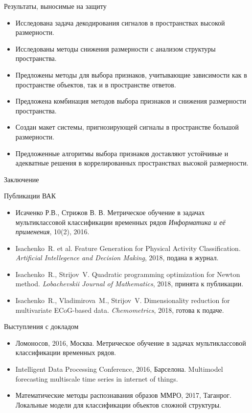 \documentclass[9pt]{beamer}
\begin{document}
\begin{frame}{Результаты, выносимые на защиту}
\begin{itemize}
	\item Исследована задача декодирования сигналов в пространствах высокой размерности.
	\vfill
	\item Исследованы методы снижения размерности с анализом структуры пространства.
	\vfill
	\item Предложены методы для выбора признаков, учитывающие зависимости как в пространстве объектов, так и в пространстве ответов.
	\vfill
	\item Предложена комбинация методов выбора признаков и снижения размерности пространства.
	\vfill
	\item Создан макет системы, пригнозирующей сигналы в пространстве большой размерности.
	\vfill
	\item Предложенные алгоритмы выбора признаков доставляют устойчивые и адекватные решения в коррелированных пространствах высокой размерности.
\end{itemize}
\end{frame}
\begin{frame}{Заключение}
	\begin{block}{Публикации ВАК}
		\vspace{-0.2cm}
		\begin{itemize}
			\item Исаченко Р.В., Стрижов В. В. Метрическое обучение в задачах мультиклассовой классификации временных рядов \emph{Информатика и её применения}, 10(2), 2016.
			\item Isachenko~R. et al. Feature Generation for Physical Activity Classification. \emph{Artificial Intellegence and Decision Making}, 2018, подана в журнал.
			\item Isachenko~R., Strijov~V. Quadratic programming optimization for Newton method. \emph{Lobachevskii Journal of Mathematics}, 2018, принята к публикации.
			\item Isachenko~R., Vladimirova~M., Strijov~V. Dimensionality reduction for multivariate ECoG-based data. \emph{Chemometrics}, 2018, готова к подаче.
		\end{itemize}
	\end{block}
\vspace{-0.2cm}
\begin{block}{Выступления с докладом}
	\vspace{-0.2cm}
	\begin{itemize}
		\item Ломоносов, 2016, Москва. Метрическое обучение в задачах мультиклассовой классификации временных рядов.
		\item Intelligent Data Processing Conference, 2016, Барселона. Multimodel forecasting multiscale time series in internet of things.
		\item Математические методы распознавания образов ММРО, 2017, Таганрог. Локальные модели для классификации объектов сложной структуры.
	\end{itemize}
\end{block}
\end{frame}
\end{document}
